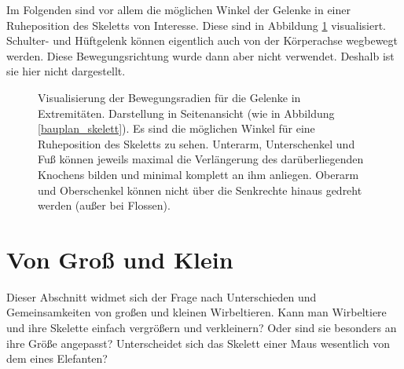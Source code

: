 Im Folgenden sind vor allem die möglichen Winkel der Gelenke in einer Ruheposition des Skeletts von Interesse. Diese sind in Abbildung \ref{joints} visualisiert. Schulter- und Hüftgelenk können eigentlich auch von der Körperachse wegbewegt werden. Diese Bewegungsrichtung wurde dann aber nicht verwendet. Deshalb ist sie hier nicht dargestellt.

\begin{figure}
  \qquad
  
  \caption{Visualisierung der Bewegungsradien für die Gelenke in Extremitäten. Darstellung in Seitenansicht (wie in Abbildung \ref{bauplan_skelett}). Es sind die möglichen Winkel für eine Ruheposition des Skeletts zu sehen. Unterarm, Unterschenkel und Fuß können jeweils maximal die Verlängerung des darüberliegenden Knochens bilden und minimal komplett an ihm anliegen. Oberarm und Oberschenkel können nicht über die Senkrechte hinaus gedreht werden (außer bei Flossen).}
  \label{joints}
 \end{figure}


\section{Von Groß und Klein}
\label{bigAndSmall}

Dieser Abschnitt widmet sich der Frage nach Unterschieden und Gemeinsamkeiten von großen und kleinen Wirbeltieren. Kann man Wirbeltiere und ihre Skelette einfach vergrößern und verkleinern? Oder sind sie besonders an ihre Größe angepasst? Unterscheidet sich das Skelett einer Maus wesentlich von dem eines Elefanten?

